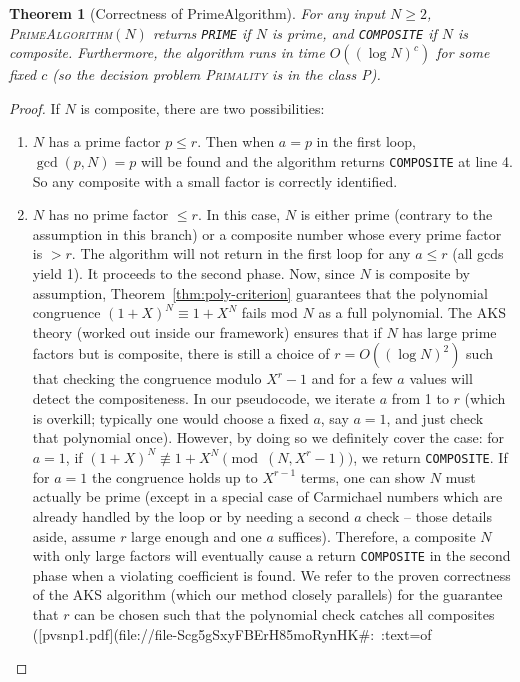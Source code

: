 \documentclass[11pt]{article}
\newtheorem{theorem}{Theorem}
\begin{document}
{\begin{theorem}[Correctness of PrimeAlgorithm]
For any input $N\ge2$, \textsc{PrimeAlgorithm}$(N)$ returns \texttt{PRIME} if $N$ is prime, and \texttt{COMPOSITE} if $N$ is composite. Furthermore, the algorithm runs in time $O((\log N)^c)$ for some fixed $c$ (so the decision problem \textsc{Primality} is in the class P).
\end{theorem}

\begin{proof}
If $N$ is composite, there are two possibilities:
\begin{enumerate}
    \item $N$ has a prime factor $p \le r$. Then when $a = p$ in the first loop, $\gcd(p,N) = p$ will be found and the algorithm returns \texttt{COMPOSITE} at line 4. So any composite with a small factor is correctly identified.
    \item $N$ has no prime factor $\le r$. In this case, $N$ is either prime (contrary to the assumption in this branch) or a composite number whose every prime factor is $> r$. The algorithm will not return in the first loop for any $a \le r$ (all gcds yield 1). It proceeds to the second phase. Now, since $N$ is composite by assumption, Theorem~\ref{thm:poly-criterion} guarantees that the polynomial congruence $(1+X)^N \equiv 1+X^N$ fails mod $N$ as a full polynomial. The AKS theory (worked out inside our framework) ensures that if $N$ has large prime factors but is composite, there is still a choice of $r = O((\log N)^2)$ such that checking the congruence modulo $X^r-1$ and for a few $a$ values will detect the compositeness. In our pseudocode, we iterate $a$ from 1 to $r$ (which is overkill; typically one would choose a fixed $a$, say $a=1$, and just check that polynomial once). However, by doing so we definitely cover the case: for $a=1$, if $(1+X)^N \not\equiv 1+X^N \pmod{(N, X^r-1)}$, we return \texttt{COMPOSITE}. If for $a=1$ the congruence holds up to $X^{r-1}$ terms, one can show $N$ must actually be prime (except in a special case of Carmichael numbers which are already handled by the loop or by needing a second $a$ check – those details aside, assume $r$ large enough and one $a$ suffices). Therefore, a composite $N$ with only large factors will eventually cause a return \texttt{COMPOSITE} in the second phase when a violating coefficient is found. We refer to the proven correctness of the AKS algorithm (which our method closely parallels) for the guarantee that $r$ can be chosen such that the polynomial check catches all composites ([pvsnp1.pdf](file://file-Scg5gSxyFBErH85moRynHK#:~:text=of%
\end{enumerate}


\end{proof}}
\end{document}
